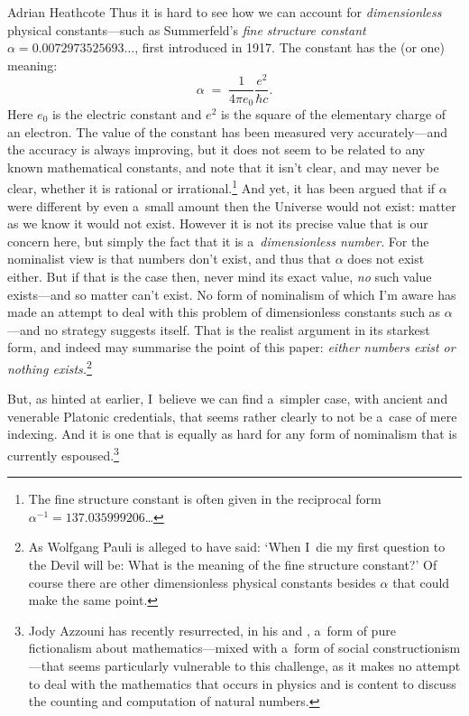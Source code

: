 \begin{artengenv}{Adrian Heathcote}
Thus it is hard to see how we can account for \textit{dimensionless} physical constants---such as Summerfeld's \textit{fine structure constant} $\alpha = 0.0072973525693\ldots$, first introduced in 1917. The constant has the (or one) meaning:
\[ \alpha\; =\; \frac{1}{4 \pi e_{0}} \frac{e^{2}}{\hbar c}.  \]
Here $e_{0}$ is the electric constant and $e^{2}$ is the square of the elementary charge of an electron. The value of the constant has been measured very accurately---and the accuracy is always improving, but it does not seem to be related to any known mathematical constants, and note that it isn't clear, and may never be clear, whether it is rational or irrational.\footnote{The fine structure constant is often given in the reciprocal form $\alpha^{-1} = 137.035999206$\ldots} And yet, it has been argued that if $\alpha$ were different by even a~small amount then the Universe would not exist: matter as we know it would not exist. However it is not its precise value that is our concern here, but simply the fact that it is a~\textit{dimensionless number.} For the nominalist view is that numbers don't exist, and thus that $\alpha$ does not exist either. But if that is the case then, never mind its exact value, \textit{no} such value exists---and so matter can't exist. No form of nominalism of which I'm aware has made an attempt to deal with this problem of dimensionless constants such as $\alpha$---and no strategy suggests itself. That is the realist argument in its starkest form, and indeed may summarise the point of this paper: \textit{either numbers exist or nothing exists.}\footnote{As Wolfgang Pauli is alleged to have said: `When I~die my first question to the Devil will be: What is the meaning of the fine structure constant?' Of course there are other dimensionless physical constants besides $\alpha$ that could make the same point.}


But, as hinted at earlier, I~believe we can find a~simpler case, with ancient and venerable Platonic credentials, that seems rather clearly to not be a~case of mere indexing. And it is one that is equally as hard for any form of nominalism that is currently espoused.\footnote{Jody Azzouni has recently resurrected, in his \parencite*{azzouni_deflating_2006} and \parencite*{azzouni_talking_2010}, a~form of pure fictionalism about mathematics---mixed with a~form of social constructionism---that seems particularly vulnerable to this challenge, as it makes no attempt to deal with the mathematics that occurs in physics and is content to discuss the counting and computation of natural numbers\parencite[see][]{batterman_explanatory_2010}.}


\end{artengenv}
